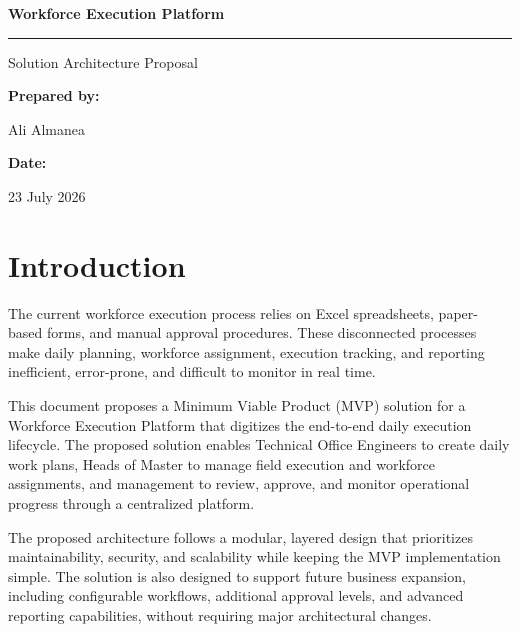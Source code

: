 \documentclass[11pt]{article}
\begin{document}
\begin{titlepage}
    \thispagestyle{empty}
    \centering
    \vspace*{0.20\textheight}

    {\Huge\bfseries Workforce Execution Platform\par}

    \vspace{0.8cm}
    \rule{0.72\textwidth}{0.8pt}\par
    \vspace{0.8cm}

    {\LARGE Solution Architecture Proposal\par}

    \vfill

    {\large
    \textbf{Prepared by:}\par
    \vspace{0.3cm}
    Ali Almanea\par

    \vspace{1.2cm}

    \textbf{Date:}\par
    \vspace{0.3cm}
    23 July 2026\par
    }

    \vspace*{0.10\textheight}
\end{titlepage}

\tableofcontents
\clearpage

\section{Introduction}

The current workforce execution process relies on Excel spreadsheets,
paper-based forms, and manual approval procedures. These disconnected processes
make daily planning, workforce assignment, execution tracking, and reporting
inefficient, error-prone, and difficult to monitor in real time.

This document proposes a Minimum Viable Product (MVP) solution for a Workforce
Execution Platform that digitizes the end-to-end daily execution lifecycle. The
proposed solution enables Technical Office Engineers to create daily work plans,
Heads of Master to manage field execution and workforce assignments, and
management to review, approve, and monitor operational progress through a
centralized platform.

The proposed architecture follows a modular, layered design that prioritizes
maintainability, security, and scalability while keeping the MVP implementation
simple. The solution is also designed to support future business expansion,
including configurable workflows, additional approval levels, and advanced
reporting capabilities, without requiring major architectural changes.
\end{document}

